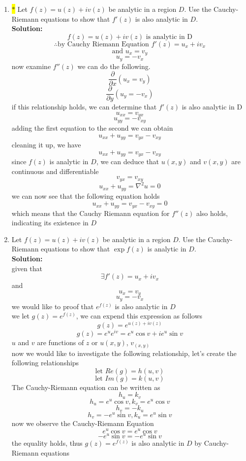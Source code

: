 \documentclass[12pt]{article}
\begin{document}
\begin{enumerate}


\item  \colorbox{yellow}{$\ast$} Let $f(z) = u(z) + iv(z)$ be analytic in a region $D$.  Use the Cauchy-Riemann equations to show that $f'(z)$ is also analytic in $D$.  \\
\textbf{Solution:}\[
\text{$f(z)=u(z)+iv(z)$ is analytic in D}
\]
\[
\therefore \text{by Cauchy Riemann Equation } f'(z)=u_x +iv_x
\]\[
\text{and } u_x=v_y
\]\[
u_y=-v_x
\]
now examine $f''(z)$ we can do the following.
\[
\frac{\partial}{\partial x} (u_x=v_y)
\]
\[
\frac{\partial}{\partial y} (u_y=-v_x)
\]
if this relationship holds, we can determine that $f'(z)$ is also analytic in D
\[
u_{xx}=v_{yx}
\]\[
u_{yy}=-v_{xy}
\]
adding the first equation to the second we can obtain
\[
u_{xx}+u_{yy}=v_{yx}-v_{xy}
\]
cleaning it up, we have 
\[
u_{xx}+u_{yy}=v_{yx}-v_{xy}
\]
since $f(z)$ is analytic in $D$, we can deduce that $u(x,y)$ and $v(x,y)$ are continuous and differentiable
\[
 v_{yx}=v_{xy}
\]
\[
u_{xx}+u_{yy}=\nabla^2u=0
\]
we can now see that the following equation holds
\[
u_{xx}+u_{yy}=v_{yx}-v_{xy}=0
\]
which means that the Cauchy Riemann equation for $f''(z)$ also holds, indicating its existence in $D$

\item Let $f(z) = u(z) + iv(z)$ be analytic in a region $D$.  Use the Cauchy-Riemann equations to show that $\exp f(z)$ is analytic in $D$.  \\
\textbf{Solution:} \\
given that
\[
\exists f'(z)=u_x+iv_x
\]
and
\[
u_x=v_y
\]
\[
u_y=-v_x
\]
we would like to proof that $e^{f(z)}$ is also analytic in $D$\\
we let $g(z)=e^{f(z)}$, we can expend this expression as follows \[
g(z)=e^{u(z)+iv(z)}
\]\[
g(z)=e^ue^{iv}=e^u\cos{v}+ie^u\sin{v}
\]
$u$ and $v$ are functions of $z$ or $u(x,y)$, $v_(x,y)$\\
now we would like to investigate the following relationship, let's create the following relationships
\[
\text{let } Re(g) = h(u,v)
\]
\[
\text{let } Im(g) = k(u,v)
\]
The Cauchy-Riemann equation can be written as
\[
h_u = k_v
\]
\[
h_u=e^u\cos{v},k_v=e^u\cos{v}
\]
\[
h_v = -k_u
\]
\[
h_v=-e^u\sin{v}, k_u=e^u\sin{v}
\]
now we observe the Cauchy-Riemann Equation
\[
e^u\cos{v}=e^u\cos{v}
\]
\[
-e^u\sin{v}=-e^u\sin{v}
\]
the equality holds, thus $g(z)=e^{f(z)}$ is also analytic in $D$ by Cauchy-Riemann equations






\end{enumerate}
\end{document}
